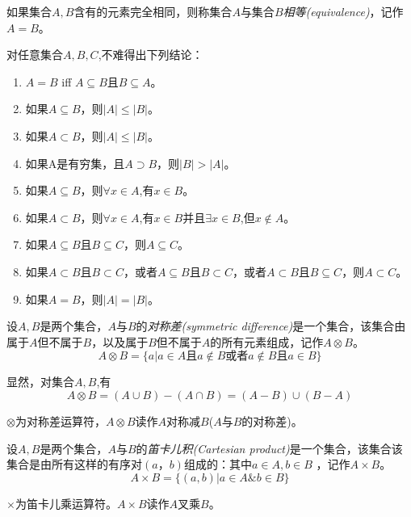 \begin{definition}
	如果集合$A,B$含有的元素完全相同，则称集合$A$与集合$B$\emph{相等(equivalence)}，记作$A=B$。
\end{definition}

对任意集合$A,B,C$,不难得出下列结论：
\begin{enumerate}
	\item $A=B$ iff $A\subseteq B$且$B\subseteq A$。
	\item 如果$A\subseteq B$，则$|A|\le|B|$。
	\item 如果$A\subset B$，则$|A|\le|B|$。
	\item 如果A是有穷集，且$A\supset B$，则$|B|>|A|$。
	\item 如果$A\subseteq B$，则$\forall x\in A$,有$x\in B$。
	\item 如果$A\subset B$，则$\forall x\in A$,有$x\in B$并且$\exists x\in B$,但$x\notin A$。
	\item 如果$A\subseteq B$且$B\subseteq C$，则$A\subseteq C$。
	\item 如果$A\subset B$且$B\subset C$，或者$A\subseteq B$且$B\subset C$，或者$A\subset B$且$B\subseteq C$，则$A\subset C$。
	\item 如果$A=B$，则$|A|=|B|$。
\end{enumerate} 

\begin{definition}
	设$A,B$是两个集合，$A$与$B$的\emph{对称差(symmetric difference)}是一个集合，该集合由属于$A$但不属于$B$，以及属于$B$但不属于$A$的所有元素组成，记作$A\otimes B$。
	$$A\otimes B = \{a|a\in A\text{且}a\notin B\text{或者}a\notin B\text{且}a\in B\}$$
\end{definition}

显然，对集合$A,B$,有
$$A\otimes B = (A\cup B) - (A\cap B) = (A-B)\cup(B-A)$$

$\otimes$为对称差运算符，$A\otimes B$读作$A$对称减$B$($A$与$B$的对称差)。

\begin{definition}
	设$A,B$是两个集合，$A$与$B$的\emph{笛卡儿积(Cartesian product)}是一个集合，该集合该集合是由所有这样的有序对$(a，b)$组成的：其中$a\in A,b\in B$ ，记作$A\times B$。
	$$A\times B = \{(a,b)|a\in A \& b\in B\}$$
\end{definition}
$\times$为笛卡儿乘运算符。$A\times B$读作$A$叉乘$B$。

